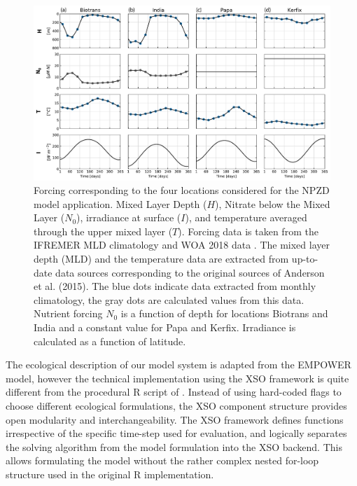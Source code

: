 \documentclass[journal abbreviation, manuscript]{copernicus}
\begin{document}
\begin{figure}[t]
\includegraphics[width=15cm]{Figures/firstdraft_plots/02_EMPOWER_forcing.pdf}
\caption{Forcing corresponding to the four locations considered for the NPZD model application. Mixed Layer Depth ($H$), Nitrate below the Mixed Layer ($N_0$), irradiance at surface ($I$), and temperature averaged through the upper mixed layer ($T$). Forcing data is taken from the IFREMER MLD climatology \citep{DeBoyerMontegut2004} and WOA 2018 data \citep{Garcia2019WORLDSilicate}. The mixed layer depth (MLD) and the temperature data are extracted from up-to-date data sources corresponding to the original sources of Anderson et al. (2015). The blue dots indicate data extracted from monthly climatology, the gray dots are calculated values from this data. Nutrient forcing $N_0$ is a function of depth for locations Biotrans and India and a constant value for Papa and Kerfix. Irradiance is calculated as a function of latitude.}
\label{Figure:EMPOWERforcing}
\end{figure}

The ecological description of our model system is adapted from the EMPOWER model, however the technical implementation using the XSO framework is quite different from the procedural R script of \citet{Anderson2015c}. Instead of using hard-coded flags to choose different ecological formulations, the XSO component structure provides open modularity and interchangeability. The XSO framework defines functions irrespective of the specific time-step used for evaluation, and logically separates the solving algorithm from the model formulation into the XSO backend. This allows formulating the model without the rather complex nested for-loop structure used in the original R implementation.
\end{document}
